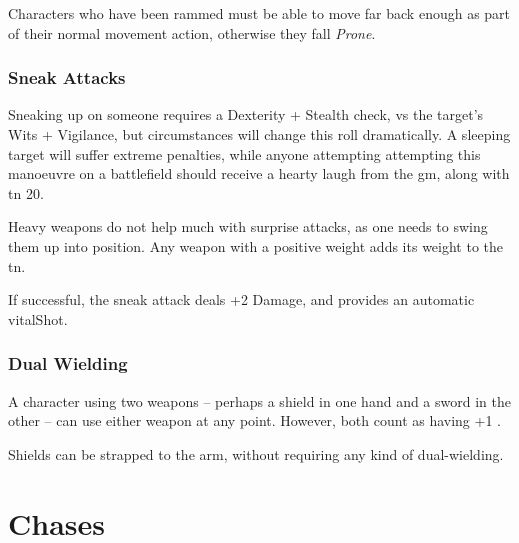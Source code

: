 \begin{multicols}{2}
Characters who have been rammed must be able to move far back enough as part of their normal movement action, otherwise they fall \textit{Prone}.

\subsubsection[Sneak Attack: Dexterity + Stealth vs Wits + Vigilance; automatic \glsentrytext{vitalShot} with +2 Damage.]{Sneak Attacks}
\label{sneakattack}

Sneaking up on someone requires a Dexterity + Stealth check, vs the target's Wits + Vigilance, but circumstances will change this roll dramatically.
A sleeping target will suffer extreme penalties, while anyone attempting attempting this manoeuvre on a battlefield should receive a hearty laugh from the \gls{gm}, along with \gls{tn} 20.

Heavy weapons do not help much with surprise attacks, as one needs to swing them up into position.
Any weapon with a positive \gls{weight} adds its \gls{weight} to the \gls{tn}.

If successful, the sneak attack deals +2 Damage, and provides an automatic \gls{vitalShot}.

\subsubsection[Dual Wielding: Both weapons count has having +1 \glsentrytext{weight}]{Dual Wielding}

A character using two weapons -- perhaps a shield in one hand and a sword in the other -- can use either weapon at any point.
However, both count as having +1 .

Shields can be strapped to the arm, without requiring any kind of dual-wielding.

\stopcontents[Manoeuvres]

\end{multicols}

\section{Chases}
\label{chases}

